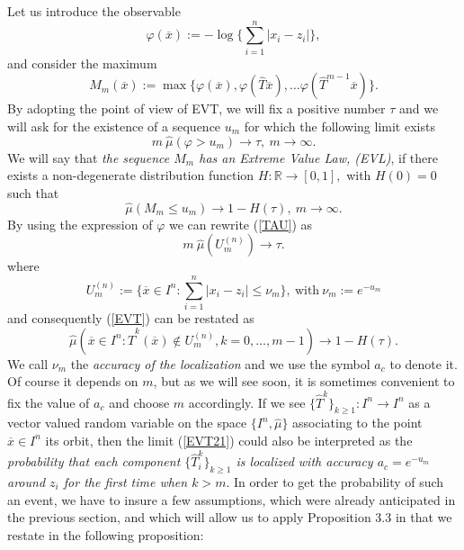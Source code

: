 \documentclass[12pt,reqno,a4paper]{amsart}
\newcommand{\T}{{\mathcal{T}}}
\def\T{\hat{T}}
\begin{document}
 Let us introduce the observable
 \begin{equation}\label{O1}
 \varphi(\overline{x}):=-\log\{\sum_{i=1}^n|x_i-z_i|\},
 \end{equation}
 and consider the maximum
 \begin{equation}\label{max}
 M_m(\overline{x}):=\max\{\varphi(\overline{x}), \varphi(\T\overline{x}),\dots \varphi(\T^{m-1}\overline{x})\}.
 \end{equation}
By adopting the point of view of EVT, we will fix a positive number $\tau$ and we will ask for the existence of  a sequence $u_m$ for which the following limit exists
\begin{equation}\label{TAU}
m\ \hat{\mu}(\varphi>u_m)\rightarrow \tau, \ m\rightarrow \infty.
\end{equation}
We will say that {\em the sequence $M_m$ has an Extreme Value Law, (EVL)}, if there exists a non-degenerate distribution function $H:\mathbb{R}\rightarrow [0,1],$ with $H(0)=0$ such that
\begin{equation}\label{EVT}
\hat{\mu}(M_m\le u_m)\rightarrow 1-H(\tau), \ m\rightarrow \infty.
\end{equation}
By using the expression of $\varphi$ we can rewrite (\ref{TAU}) as
\begin{equation}\label{TAU2}
m\ \hat{\mu}(U^{(n)}_m)\rightarrow \tau.
\end{equation}
where
\begin{equation}\label{DL1}
U^{(n)}_m:=\{\overline{x}\in I^n: \sum_{i=1}^n|x_i-z_i|\le \nu_m\},\  \text{with} \ \nu_m:=e^{-u_m}
\end{equation}
and consequently (\ref{EVT}) can be restated as
\begin{equation}\label{EVT21}
\hat{\mu}(\overline{x}\in I^n: \T^k(\overline{x})\notin U^{(n)}_m, k=0,\dots,m-1)\rightarrow 1-H(\tau).
\end{equation}
We call $\nu_m$ the {\em accuracy of the localization} and we use the symbol $a_c$ to denote it. Of course it depends on $m$, but as we will see soon, it is sometimes convenient to fix the value of $a_c$ and choose $m$ accordingly. If we see $\{\hat{T}^k\}_{k\ge 1}: I^n\rightarrow I^n$ as a   vector valued random variable on the space $\{I^n, \hat{\mu}\}$ associating to the point   $\overline{x}\in I^n$ its orbit,  then  the limit (\ref{EVT21}) could also be interpreted as the  {\em probability that each component $\{\hat{T}^k_i\}_{k\ge 1}$  is  localized with accuracy $a_c=e^{-u_m}$ around $z_i$  for the first time when $k>m.$}  In order to get the probability of such an event, we have  to insure a few assumptions, which were already anticipated in the previous section, and which will allow us  to apply Proposition 3.3 in \cite{AFV} that we restate in the following proposition:
\end{document}
